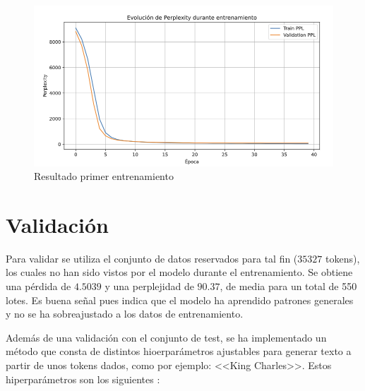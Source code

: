 \documentclass[11pt]{book}
\begin{document}
\begin{figure}[h]
    \centering
    \includegraphics[width=0.5\linewidth]{img/resultado_entrenamiento_v2.png}
    \caption{Resultado primer entrenamiento}
    \label{fig:placeholder25}
\end{figure}

\section{Validación}
Para validar se utiliza el conjunto de datos reservados para tal fin ($35327$ tokens), los cuales no han sido vistos por el modelo durante el entrenamiento. Se obtiene una pérdida de $4.5039$ y una perplejidad de $90.37$, de media para un total de 550 lotes. Es buena señal pues indica que el modelo ha aprendido patrones generales y no se ha sobreajustado a los datos de entrenamiento.

Además de una validación con el conjunto de test, se ha implementado un método que consta de distintos hioerparámetros ajustables para generar texto a partir de unos tokens dados, como por ejemplo: <<King Charles>>. Estos hiperparámetros son los siguientes \parencite{vyas2025transformer_decoder_part3}: 
\end{document}
